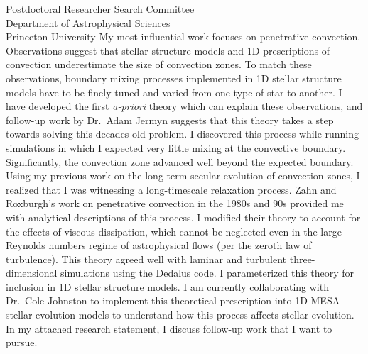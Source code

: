 \documentclass[12pt]{letter}
\begin{document}
\begin{letter}{
               Postdoctoral Researcher Search Committee \\
               Department of Astrophysical Sciences \\
               Princeton University
           }
    My most influential work focuses on penetrative convection.
    Observations suggest that stellar structure models and 1D prescriptions of convection underestimate the size of convection zones.
    To match these observations, boundary mixing processes implemented in 1D stellar structure models have to be finely tuned and varied from one type of star to another.
    I have developed the first \emph{a-priori} theory which can explain these observations, and follow-up work by Dr.~Adam Jermyn suggests that this theory takes a step towards solving this decades-old problem.
    I discovered this process while running simulations in which I expected very little mixing at the convective boundary.
    Significantly, the convection zone advanced well beyond the expected boundary.
    Using my previous work on the long-term secular evolution of convection zones, I realized that I was witnessing a long-timescale relaxation process.
    Zahn and Roxburgh's work on penetrative convection in the 1980s and 90s provided me with analytical descriptions of this process.
    I modified their theory to account for the effects of viscous dissipation, which cannot be neglected even in the large Reynolds numbers regime of astrophysical flows (per the zeroth law of turbulence).
    This theory agreed well with laminar and turbulent three-dimensional simulations using the Dedalus code.
    I parameterized this theory for inclusion in 1D stellar structure models.
    I am currently collaborating with Dr.~Cole Johnston to implement this theoretical prescription into 1D MESA stellar evolution models to understand how this process affects stellar evolution.
    In my attached research statement, I discuss follow-up work that I want to pursue.


\end{letter}
\end{document}
